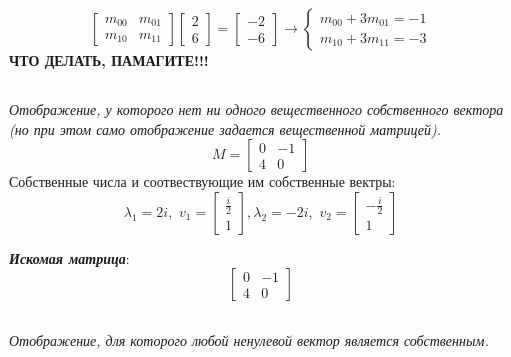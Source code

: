 \documentclass[a5paper, 10pt]{article}
\theoremstyle{definition}
\theoremstyle{plain}
\theoremstyle{remark}
\begin{document}
\begin{equation}
\begin{bmatrix}
m_{0 0} & m_{0 1}\\
m_{1 0} & m_{1 1}
\end{bmatrix}
\begin{bmatrix}
2\\
6
\end{bmatrix}
=
\begin{bmatrix}
-2\\
-6
\end{bmatrix}
\to
\begin{cases}
m_{0 0} + 3m_{0 1} = -1\\
m_{1 0} + 3m_{1 1} = -3
\end{cases}
\end{equation}
\textbf{ЧТО ДЕЛАТЬ, ПАМАГИТЕ!!!}

\subsection{}
\textit{Отображение, у которого нет ни одного вещественного собственного вектора (но при этом само отображение задается вещественной матрицей).}\\
\begin{equation}
M =
\begin{bmatrix}
0 & -1\\
4 & 0
\end{bmatrix}
\end{equation}
Собственные числа и соотвествующие им собственные вектры:
\begin{equation}
\lambda_1 = 2i, \, \, 
v_1 = 
\begin{bmatrix}
\frac{i}{2}\\
1
\end{bmatrix}
,
\lambda_2 =- 2i, \, \, 
v_2 = 
\begin{bmatrix}
-\frac{i}{2}\\
1
\end{bmatrix}
\end{equation}

\textit{\textbf{Искомая матрица}}:
\begin{equation}
\begin{bmatrix}
0 & -1\\
4 & 0
\end{bmatrix}
\end{equation}


\subsection{}
\textit{Отображение, для которого любой ненулевой вектор является собственным.}\\
\end{document}
